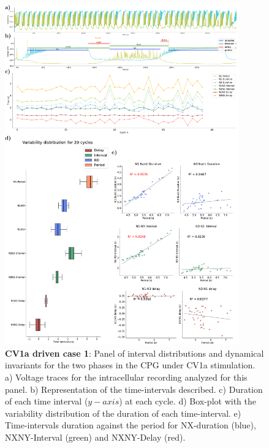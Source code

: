 \begin{figure}[htbp]
	\centering
	\includegraphics[width=0.9\textwidth]{./img/invariants/data/SUSSEX/CV1a_driven1/images/2phases/panel_with_intervals.pdf}
	\caption{\textbf{CV1a driven case 1}: Panel of interval distributions and dynamical invariants for the two phases in the CPG under CV1a stimulation. a) Voltage traces for the intracellular recording analyzed for this panel. b) Representation of the time-intervals described. c) Duration of each time interval ($y-axis$) at each cycle. d) Box-plot with the variability distribution of the duration of each time-interval. e) Time-intervals duration against the period for NX-duration (blue), NXNY-Interval (green) and NXNY-Delay (red).}
	\label{fig:cv1a 1 2phases}
\end{figure}




